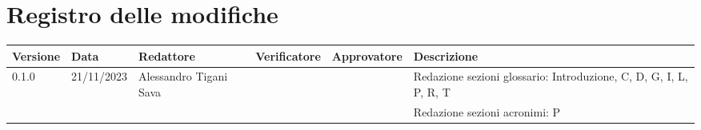 \section*{Registro delle modifiche}
{
\renewcommand{\arraystretch}{1.5}
\scriptsize
\begin{tabularx}{\textwidth}{lllllX}
	\textbf{Versione} & \textbf{Data} & \textbf{Redattore} 		& \textbf{Verificatore} & \textbf{Approvatore} 	& \textbf{Descrizione}\\
	\hline
	0.1.0			  & 21/11/2023    & Alessandro Tigani Sava	& 			 			& 		 			   	& Redazione sezioni glossario: Introduzione, C, D, G, I, L, P, R, T    \\
				 	  &     		  & 						& 			 			& 		 			   	& Redazione sezioni acronimi: P \\
	\hline
\end{tabularx}
}

